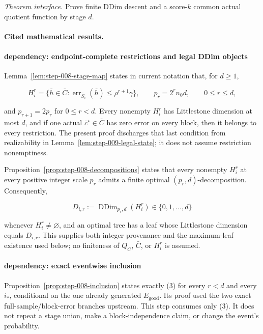 \noindent\textit{Theorem interface.} Prove finite DDim descent and a score-\(k\) common actual   quotient function by stage \(d\).

\paragraph{Cited mathematical results.}


\paragraph{dependency: endpoint-complete restrictions and legal DDim objects}

Lemma~\ref{lem:step-008-stage-map} states in current notation that,
for \(d\ge1\),

\[
 H_i^r
 =\{\bar h\in\bar C:
       \operatorname{err}_{\bar S_i}(\bar h)
       \leq\rho^{r+1}\gamma\},
 \qquad
 p_r=2^rn_0d,
 \qquad 0\le r\le d,
 \tag{5}
\]

and \(p_{r+1}=2p_r\) for \(0\le r<d\). Every nonempty \(H_i^r\) has
Littlestone dimension at most \(d\), and if one actual
\(\bar c^\star\in\bar C\) has zero error on every block, then it belongs to
every restriction. The present proof discharges that last condition from
realizability in Lemma~\ref{lem:step-009-legal-state}; it does not assume
restriction nonemptiness.

Proposition~\ref{prop:step-008-decompositions} states that every
nonempty \(H_i^r\) at every positive integer scale \(p_r\) admits a finite
optimal \((p_r,d)\)-decomposition. Consequently,

\[
 D_{i,r}:=\operatorname{DDim}_{p_r,d}(H_i^r)
 \in\{0,1,\ldots,d\}
 \tag{6}
\]

whenever \(H_i^r\ne\varnothing\), and an optimal tree has a leaf whose
Littlestone dimension equals \(D_{i,r}\). This supplies both integer
provenance and the maximum-leaf existence used below; no finiteness of
\(Q_C\), \(\bar C\), or \(H_i^r\) is assumed.

\paragraph{dependency: exact eventwise inclusion}

Proposition~\ref{prop:step-008-inclusion} states exactly (3) for
every \(r<d\) and every \(i_*\), conditional on the one already generated
\(E_{\mathrm{good}}\). Its proof used the two exact full-sample/block-error
branches upstream. This step consumes only (3). It does not repeat a stage
union, make a block-independence claim, or change the event's probability.


